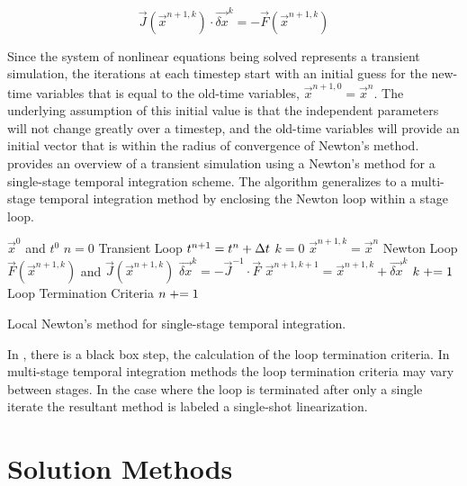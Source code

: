 \begin{equation}
\label{eqn:newton}
\vec{J}(\vec{x}^{n+1,k})\cdot \vec{\delta x}^k = -\vec{F}(\vec{x}^{n+1,k})
\end{equation} 

Since the system of nonlinear equations being solved represents a transient simulation, the iterations at each timestep start with an initial guess for the new-time variables that is equal to the old-time variables, $\vec{x}^{n+1,0} = \vec{x}^{n}$.
The underlying assumption of this initial value is that the independent parameters will not change greatly over a timestep, and the old-time variables will provide an initial vector that is within the radius of convergence of Newton's method.
 provides an overview of a transient simulation using a Newton's method for a single-stage temporal integration scheme.
The algorithm generalizes to a multi-stage temporal integration method by enclosing the Newton loop within a stage loop.

\begin{algo}[ht!]
\setlength{\baselineskip}{0.625\baselineskip}
\begin{algorithmic}[1]
\Require $\vec{x}^{0}$ and $t^{0}$
\Set $n = 0$
\Loop \; Transient Loop
    \Set $t^{n+1} = t^{n} + \dt{}$
    \Set $k = 0$
    \Set $\vec{x}^{n+1,k} = \vec{x}^{n}$
    \Loop \; Newton Loop
		\Calculate $\vec{F}(\vec{x}^{n+1,k})$ and $\vec{J}(\vec{x}^{n+1,k})$
		\Calculate $\vec{\delta x}^k = - \vec{J}^{-1}\cdot\vec{F}$
		\Calculate $\vec{x}^{n+1,k+1} = \vec{x}^{n+1, k} + \vec{\delta x}^{k}$
		\Set $k \mathrel{+}= 1$
		\BlackBox Loop Termination Criteria
	\EndLoop
	\Set $n \mathrel{+}= 1$
\EndLoop
\end{algorithmic}
\caption{Local Newton's method for single-stage temporal integration.}
\label{alg:local_newton}
\end{algo}

In , there is a black box step, the calculation of the loop termination criteria.
In multi-stage temporal integration methods the loop termination criteria may vary between stages. 
In the case where the loop is terminated after only a single iterate the resultant method is labeled a single-shot linearization.

\section{Solution Methods}
\label{sect:solution_techniques}

